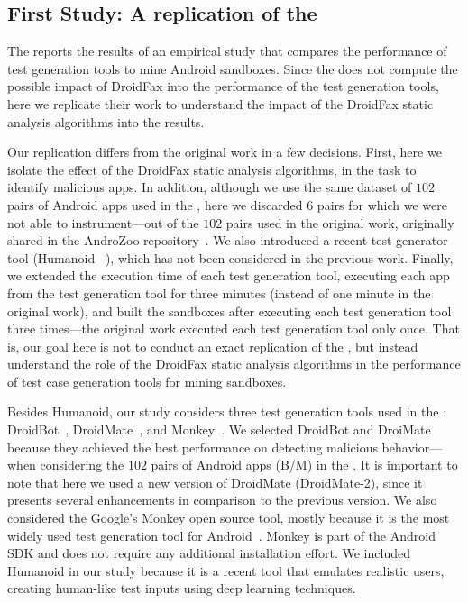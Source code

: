 \subsection{First Study: A replication of the \blls}\label{sec:set1}

The \blls reports the results of an empirical study that compares the performance of test generation tools to mine Android
sandboxes. Since the \blls does not
compute the possible impact of DroidFax into the performance of the test generation tools,
here we replicate their work to understand the impact of the DroidFax static analysis algorithms into the \blls results.

Our replication differs from the original work in a few decisions. First, here we isolate
the effect of the DroidFax static analysis algorithms, in the task to identify malicious apps. In addition, although we use the same dataset of
$102$ pairs of Android apps used in the \blls, here we discarded $6$ pairs for which
we were not able to instrument---out of the $102$ pairs used in the original work, originally shared in the AndroZoo repository~\cite{DBLP:conf/msr/AllixBKT16}. We also introduced a recent test generator tool (Humanoid ~\cite{DBLP:conf/kbse/LiY0C19}), which
has not been considered in the previous work. Finally, we extended the execution time of each test generation tool,
executing each app from the test generation tool for three minutes (instead of one minute in the
original work),
and built the sandboxes after executing each test generation tool
three times---the original work executed each test generation tool
only once. That is, our goal here is not to conduct an
exact replication of the \blls, but instead understand
the role of the DroidFax static analysis algorithms in the
performance of test case generation tools for mining sandboxes.

Besides Humanoid, our study considers three test generation tools used in the \blls: DroidBot~\cite{DBLP:conf/icse/LiYGC17},
DroidMate~\cite{DBLP:conf/icse/JamrozikZ16}, and Monkey~\cite{Monkey}. We selected DroidBot and DroiMate because they achieved
the best performance on detecting malicious behavior---when considering the $102$ pairs of Android apps (B/M) in the \blls.
It is important to note that here we used a new version of DroidMate (DroidMate-2), since it presents several enhancements
in comparison to the previous version. We also considered the Google's Monkey open source tool, mostly because it is the most
widely used test generation tool for Android~\cite{DBLP:conf/sigsoft/ZengLZXDLYX16}. Monkey is part of the Android SDK
and does not require any additional installation effort. We included Humanoid in our study
because it is a recent tool that emulates realistic users, creating human-like test inputs using deep learning techniques.

